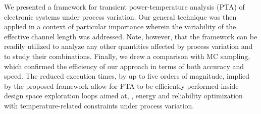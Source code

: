 We presented a framework for transient power-temperature analysis (PTA) of electronic systems under process variation.
Our general technique was then applied in a context of particular importance wherein the variability of the effective channel length was addressed.
Note, however, that the framework can be readily utilized to analyze any other quantities affected by process variation and to study their combinations.
Finally, we drew a comparison with MC sampling, which confirmed the efficiency of our approach in terms of both accuracy and speed.
The reduced execution times, by up to five orders of magnitude, implied by the proposed framework allow for PTA to be efficiently performed inside design space exploration loops aimed at, \eg, energy and reliability optimization with temperature-related constraints under process variation.
